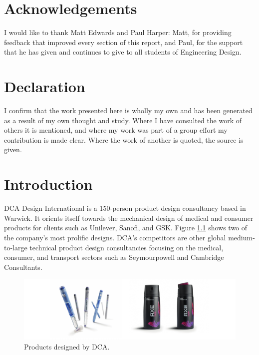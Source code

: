\documentclass[11pt,a4paper,article]{memoir} %
\begin{document}
\newpage
\chapter*{\large Acknowledgements}
\vspace*{-2\baselineskip}
I would like to thank Matt Edwards and Paul Harper: Matt, for providing feedback that improved every section of this report, and Paul, for the support that he has given and continues to give to all students of Engineering Design.\\


\chapter*{\large Declaration}
\vspace*{-2\baselineskip}
I confirm that the work presented here is wholly my own and has been generated as a result of my own thought and study. Where I have consulted the work of others it is mentioned, and where my work was part of a group effort my contribution is made clear. Where the work of another is quoted, the source is given.

\newpage
\chapter{Introduction}
DCA Design International is a 150-person product design consultancy based in Warwick. It orients itself towards the mechanical design of medical and consumer products for clients such as Unilever, Sanofi, and GSK. Figure \ref{fig:dca_profile} shows two of the company's most prolific designs. DCA's competitors are other global medium-to-large technical product design consultancies focusing on the medical, consumer, and transport sectors such as Seymourpowell and Cambridge Consultants.
\par
\begin{figure}[b]
\includegraphics[width=\textwidth]{DCA_profile.pdf}
\caption{Products designed by DCA.}
\label{fig:dca_profile}
\end{figure}
\end{document}
